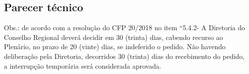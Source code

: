 \documentclass[openright, oneside, a4paper, article, brazil]{abntex2}
\begin{document}
\setasuspacing{\SingleSpace}\justifying
\subsection{Parecer técnico}
\vspace{0.5\baselineskip}

\noindent\small Obs.: de acordo com a resolução do CFP 20/2018 no item “5.4.2- A Diretoria do Conselho Regional deverá decidir em 30 (trinta) dias, cabendo recurso ao Plenário, no prazo de 20 (vinte) dias, se indeferido o pedido. Não havendo deliberação pela Diretoria, decorridos 30 (trinta) dias do recebimento do pedido, a interrupção temporária será considerada aprovada.
\end{document}
